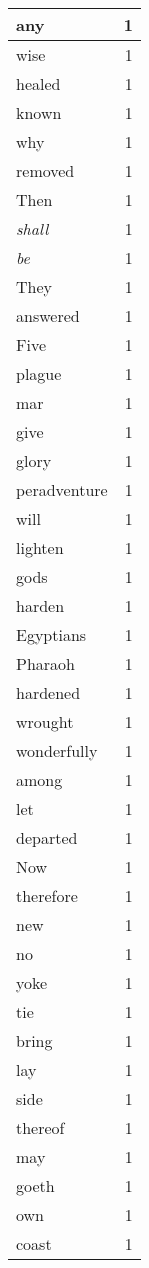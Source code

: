 \begin{center}
\begin{longtable}{l|r}
any & 1 \\ \hline
wise & 1 \\ \hline
healed & 1 \\ \hline
known & 1 \\ \hline
why & 1 \\ \hline
removed & 1 \\ \hline
Then & 1 \\ \hline
\emph{shall} & 1 \\ \hline
\emph{be} & 1 \\ \hline
They & 1 \\ \hline
answered & 1 \\ \hline
Five & 1 \\ \hline
plague & 1 \\ \hline
mar & 1 \\ \hline
give & 1 \\ \hline
glory & 1 \\ \hline
peradventure & 1 \\ \hline
will & 1 \\ \hline
lighten & 1 \\ \hline
gods & 1 \\ \hline
harden & 1 \\ \hline
Egyptians & 1 \\ \hline
Pharaoh & 1 \\ \hline
hardened & 1 \\ \hline
wrought & 1 \\ \hline
wonderfully & 1 \\ \hline
among & 1 \\ \hline
let & 1 \\ \hline
departed & 1 \\ \hline
Now & 1 \\ \hline
therefore & 1 \\ \hline
new & 1 \\ \hline
no & 1 \\ \hline
yoke & 1 \\ \hline
tie & 1 \\ \hline
bring & 1 \\ \hline
lay & 1 \\ \hline
side & 1 \\ \hline
thereof & 1 \\ \hline
may & 1 \\ \hline
goeth & 1 \\ \hline
own & 1 \\ \hline
coast & 1 \\ \hline

\end{longtable}
\end{center}

